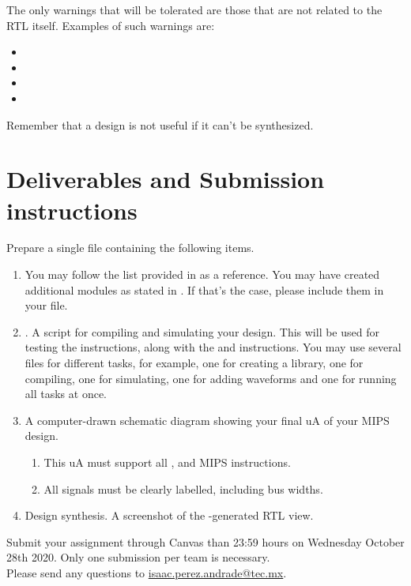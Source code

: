 \documentclass[number=03]{assignment}
\newcommand{\mipsdofile}{\colorfilename{mips.do}}
\newcommand{\deadline}{23:59 hours on Wednesday October 28th 2020}
\begin{document}
\begin{enumerate}
\begin{sloppypar}
The only warnings that will be tolerated are those that are not related to the \acs{RTL} itself. 
Examples of such warnings are:
\begin{itemize}
\item {} \linebreak{}
\item {}
\item {}
\item {}
\end{itemize}
\end{sloppypar}
Remember that a design is not useful if it can't be synthesized.
\end{enumerate}


\section{Deliverables and Submission instructions}\label{sec:Deliverables}
Prepare a single  file containing the following items.
\begin{enumerate}
\item {} 
You may follow the list provided in  as a reference.
You may have created additional \SV modules as stated in .
If that's the case, please include them in your  file.
\item \mipsdofile. A \ModelSim script for compiling and simulating your design. This will be used for testing the \Jtype instructions, along with the \Rtype and \Itype instructions. You may use several  files for different tasks, for example, one  for creating a library, one for compiling, one for simulating, one for adding waveforms and one for running all tasks at once.
  \item A computer-drawn schematic diagram showing your final \ac{uA} of your \ac{MIPS} design. 
    \begin{enumerate}
      \item This \ac{uA} must support all \Rtype, \Itype and \Jtype \ac{MIPS} instructions. 
      \item All signals must be clearly labelled, including bus widths.
     \end{enumerate}
  \item Design synthesis. A screenshot of the \Quartus-generated \ac{RTL} view.
\end{enumerate}


Submit your assignment through Canvas  than \deadline.
Only one submission per team is necessary.
\\
Please send any questions to \href{mailto:isaac.perez.andrade@tec.mx}{isaac.perez.andrade@tec.mx}.
\end{document}
